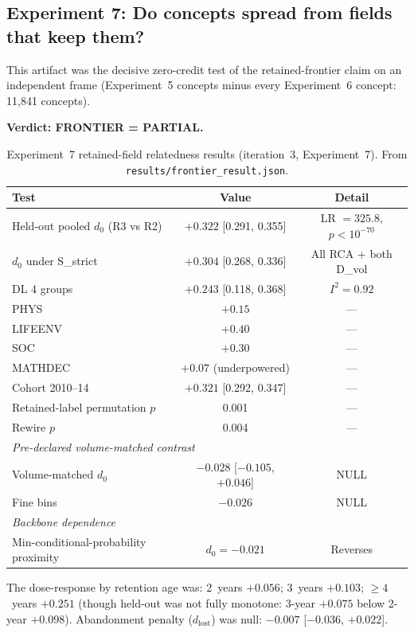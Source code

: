 \documentclass[11pt,letterpaper]{article}
\begin{document}
\subsection{Experiment 7: Do concepts spread from fields that keep them?}

This artifact was the decisive zero-credit test of the retained-frontier claim on an independent frame (Experiment~5 concepts minus every Experiment~6 concept: 11{,}841 concepts).

\textbf{Verdict: FRONTIER = PARTIAL.}

\begin{table}[!htbp]
\centering
\caption{Experiment~7 retained-field relatedness results (iteration~3, Experiment~7). From \texttt{results/frontier\_result.json}.}
\label{tab:exp7_frontier}
\small
\begin{tabular}{p{5cm}cc}
\toprule
Test & Value & Detail \\
\midrule
Held-out pooled $d_0$ (R3 vs R2) & $+0.322$ [0.291, 0.355] & LR $= 325.8$, $p < 10^{-70}$ \\
$d_0$ under S\_strict & $+0.304$ [0.268, 0.336] & All RCA + both D\_vol \\
DL 4 groups & $+0.243$ [0.118, 0.368] & $I^2 = 0.92$ \\
PHYS & $+0.15$ & --- \\
LIFEENV & $+0.40$ & --- \\
SOC & $+0.30$ & --- \\
MATHDEC & $+0.07$ (underpowered) & --- \\
Cohort 2010--14 & $+0.321$ [0.292, 0.347] & --- \\
Retained-label permutation $p$ & 0.001 & --- \\
Rewire $p$ & 0.004 & --- \\
\midrule
\multicolumn{3}{l}{\textit{Pre-declared volume-matched contrast}} \\
Volume-matched $d_0$ & $-0.028$ [$-0.105$, $+0.046$] & NULL \\
Fine bins & $-0.026$ & NULL \\
\midrule
\multicolumn{3}{l}{\textit{Backbone dependence}} \\
Min-conditional-probability proximity & $d_0 = -0.021$ & Reverses \\
\bottomrule
\end{tabular}
\end{table}

The dose-response by retention age was: 2~years $+0.056$; 3~years $+0.103$; $\geq 4$~years $+0.251$ (though held-out was not fully monotone: 3-year $+0.075$ below 2-year $+0.098$). Abandonment penalty ($d_{\text{lost}}$) was null: $-0.007$ [$-0.036$, $+0.022$].
\end{document}

